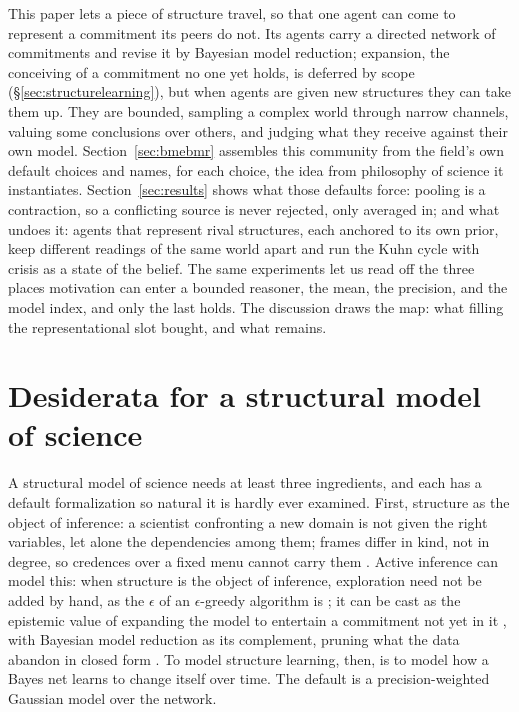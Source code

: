 This paper lets a piece of structure travel, so that one agent can come to represent a
commitment its peers do not. Its agents carry a directed network of commitments and revise
it by Bayesian model reduction; expansion, the conceiving of a commitment no one yet holds,
is deferred by scope (\S\ref{sec:structurelearning}), but when agents are given new
structures they can take them up. They are bounded, sampling a complex world through narrow
channels, valuing some conclusions over others, and judging what they receive against their
own model. Section~\ref{sec:bmebmr} assembles this community from the field's own default
choices and names, for each choice, the idea from philosophy of science it instantiates.
Section~\ref{sec:results} shows what those defaults force: pooling is a contraction, so a
conflicting source is never rejected, only averaged in; and what undoes it: agents that
represent rival structures, each anchored to its own prior, keep different readings of the
same world apart and run the Kuhn cycle with crisis as a state of the belief. The same
experiments let us read off the three places motivation can enter a bounded reasoner, the
mean, the precision, and the model index, and only the last holds. The discussion draws the
map: what filling the representational slot bought, and what remains.

\section{Desiderata for a structural model of science}
\label{sec:hidden}

A structural model of science needs at least three ingredients, and each has a default
formalization so natural it is hardly ever examined. First, structure as the object of
inference: a scientist confronting a new domain is not given the right variables, let alone
the dependencies among them; frames differ in kind, not in degree, so credences over a fixed
menu cannot carry them \citep{ullman2020,kemp2008form,ullman2012}. Active inference can
model this: when structure is the object of inference, exploration need not be added by
hand, as the $\epsilon$ of an $\epsilon$-greedy algorithm is \citep{zollman2010,oconnor2019};
it can be cast as the epistemic value of expanding the model to entertain a commitment not
yet in it \citep{friston2015,friston2017curiosity}, with Bayesian model reduction as its
complement, pruning what the data abandon in closed form \citep{friston2018bmr,neacsu2022}.
To model structure learning, then, is to model how a Bayes net learns to change itself over
time. The default is a precision-weighted Gaussian model over the network.


